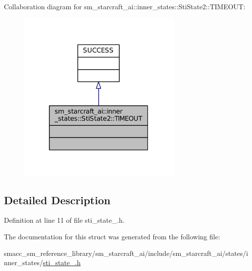 Collaboration diagram for sm\+\_\+starcraft\+\_\+ai\+:\+:inner\+\_\+states\+:\+:Sti\+State2\+:\+:T\+I\+M\+E\+O\+UT\+:
\nopagebreak
\begin{figure}[H]
\begin{center}
\leavevmode
\includegraphics[width=231pt]{structsm__starcraft__ai_1_1inner__states_1_1StiState2_1_1TIMEOUT__coll__graph}
\end{center}
\end{figure}


\subsection{Detailed Description}


Definition at line 11 of file sti\+\_\+state\+\_.\+h.



The documentation for this struct was generated from the following file\+:\begin{DoxyCompactItemize}
\item 
smacc\+\_\+sm\+\_\+reference\+\_\+library/sm\+\_\+starcraft\+\_\+ai/include/sm\+\_\+starcraft\+\_\+ai/states/inner\+\_\+states/\hyperlink{sm__starcraft__ai_2include_2sm__starcraft__ai_2states_2inner__states_2sti__state__2_8h}{sti\+\_\+state\+\_.\+h}\end{DoxyCompactItemize}
